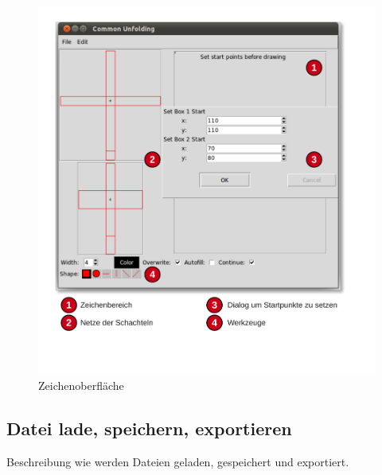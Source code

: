   \begin{figure}[htbp]
  \centering
  \includegraphics[scale=0.5]{03_pics/Zeichenbereich.pdf}
  \caption{Zeichenoberfläche}
  \label{fig:zeichenoberflaeche}
  \end{figure}


\subsection{Datei lade, speichern, exportieren}
\label{subsec:dateioperationen}

Beschreibung wie werden Dateien geladen, gespeichert und exportiert.